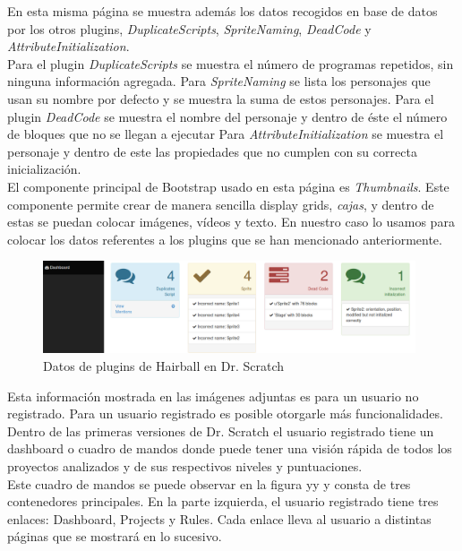 \documentclass[a4paper, 12pt]{book}
\begin{document}
En esta misma página se muestra además los datos recogidos en base de datos por los
otros plugins, \emph{DuplicateScripts}, \emph{SpriteNaming}, \emph{DeadCode} y 
\emph{AttributeInitialization}.\\ 

Para el plugin \emph{DuplicateScripts} se muestra el número de programas repetidos, sin 
ninguna información agregada. Para \emph{SpriteNaming} se lista los personajes que usan
su nombre por defecto y se muestra la suma de estos personajes. 
Para el plugin \emph{DeadCode} se muestra el nombre del personaje y dentro de éste el 
número de bloques que no se llegan a ejecutar
Para \emph{AttributeInitialization} se muestra el personaje y dentro de este las 
propiedades que no cumplen con su correcta inicialización. \\

El componente principal de Bootstrap usado en esta página es \emph{Thumbnails}. Este
componente permite crear de manera sencilla display grids, \emph{cajas}, y dentro de
estas se puedan colocar imágenes, vídeos y texto. En nuestro caso lo usamos para
colocar los datos referentes a los plugins que se han mencionado anteriormente. \\ 

 \begin{figure}
		\graphicspath{{img/}}
    \includegraphics[bb=0 0 800 600, width=11cm, keepaspectratio]{plugins.png}
		\caption{Datos de plugins de Hairball en Dr. Scratch}
    \label{figura:foro_hilos}
 \end{figure} 

Esta información mostrada en las imágenes adjuntas es para un usuario no registrado.
Para un usuario registrado es posible otorgarle más funcionalidades. Dentro de las
primeras versiones de Dr. Scratch el usuario registrado tiene un dashboard o cuadro
de mandos donde puede tener una visión rápida de todos los proyectos analizados y de
sus respectivos niveles y puntuaciones. \\

Este cuadro de mandos se puede observar en la figura yy y consta de tres contenedores
principales. En la parte izquierda, el usuario registrado tiene tres enlaces: Dashboard,
Projects y Rules. Cada enlace lleva al usuario a distintas páginas que se mostrará en
lo sucesivo. \\
\end{document}
